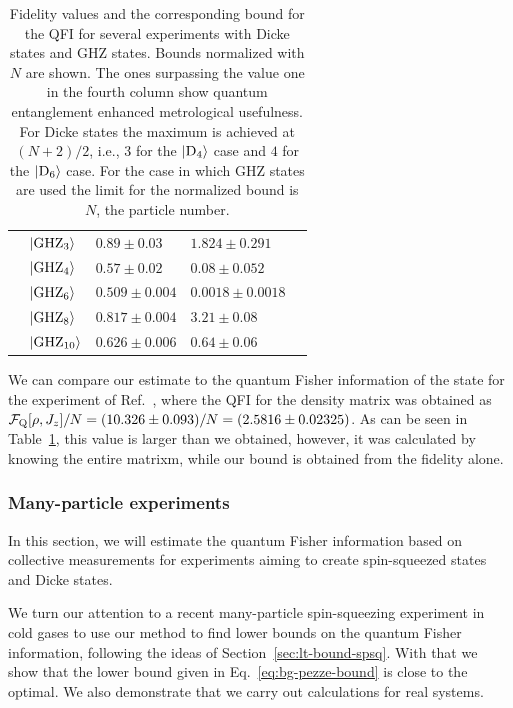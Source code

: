 \begin{table}
\begin{center}
\begin{tabular}{| l | l | l | l | l |}
      & $\vert{\textnormal{GHZ}_{3}}\rangle$  & $0.89\pm0.03$   & $1.824\pm0.291$ & \cite{Leibfried2004} \\
      & $\vert{\textnormal{GHZ}_{4}}\rangle$  & $0.57\pm0.02$   & $0.08\pm0.052$  & \cite{Sackett2000}\\
      & $\vert{\textnormal{GHZ}_{6}}\rangle$  & $0.509\pm0.004$ & $0.0018\pm0.0018$ & \cite{Leibfried2005} \\
      & $\vert{\textnormal{GHZ}_{8}}\rangle$  & $0.817\pm0.004$ & $3.21\pm0.08$ & \cite{Monz2011} \\
      & $\vert{\textnormal{GHZ}_{10}}\rangle$ & $0.626\pm0.006$ & $0.64\pm0.06$ & \cite{Monz2011} \\ \hline
    \end{tabular}
  \end{center}
  \caption[Bounds on QFI for experimental data when fidelities are measured]{Fidelity values and the corresponding bound for the QFI for several experiments with Dicke states and GHZ states.
  Bounds normalized with $N$ are shown.
  The ones surpassing the value one in the fourth column show quantum entanglement enhanced metrological usefulness.
  For Dicke states the maximum is achieved at $(N+2)/2$, i.e., $3$ for the $\vert{\ensuremath{\textnormal{D}_{4}}}\rangle$ case and $4$ for the $\vert{\ensuremath{\textnormal{D}_{6}}}\rangle$ case.
  For the case in which GHZ states are used the limit for the normalized bound is $N$, the particle number.}
  \label{tab:lt-results-for-fidelities}
\end{table}

We can compare our estimate to the quantum Fisher information of the state for the experiment of Ref.~\cite{Krischek2011}, where the QFI for the density matrix was obtained as $\mathcal{F}_{\textnormal{Q}}[{\textstyle \rho,J_z}]/N=(10.326\pm0.093)/N=(2.5816\pm0.02325)$.
As can be seen in Table~\ref{tab:lt-results-for-fidelities}, this value is larger than we obtained, however, it was calculated by knowing the entire matrixm, while our bound is obtained from the fidelity alone.

\subsubsection{Many-particle experiments}
\label{sec:lt-many-particle-experiments}

In this section, we will estimate the quantum Fisher information based on collective measurements for experiments aiming to create spin-squeezed states and Dicke states.


We turn our attention to a recent many-particle spin-squeezing experiment in cold gases to use our method to find lower bounds on the quantum Fisher information, following the ideas of Section~\ref{sec:lt-bound-spsq}.
With that we show that the lower bound given in Eq.~\eqref{eq:bg-pezze-bound} is close to the optimal.
We also demonstrate that we carry out calculations for real systems.

